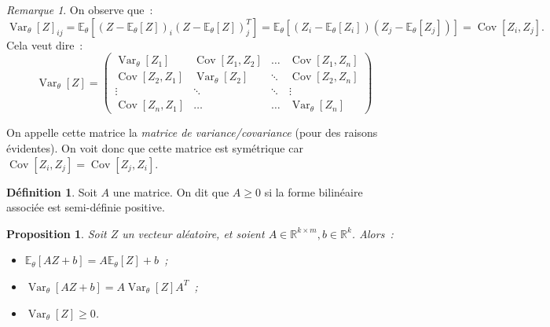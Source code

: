 \documentclass{report}
\DeclareMathOperator{\Var}{Var}
\DeclareMathOperator{\Cov}{Cov}
\newcommand{\E}{\mathbb E}
\newcommand{\R}{\mathbb R}
\newtheorem{prp}[thm]{Proposition}
\theoremstyle{definition}
\newtheorem{déf}[thm]{Définition}
\theoremstyle{remark}
\newtheorem*{rmq}{Remarque}
\begin{document}
			\begin{rmq} On observe que~:
			\[\Var_\theta[Z]_{ij} = \E_\theta\left[(Z - \E_\theta[Z])_i(Z - \E_\theta[Z])_j^T\right] = \E_\theta\left[(Z_i - \E_\theta[Z_i])(Z_j - \E_\theta[Z_j])\right]
				= \Cov[Z_i, Z_j].\]
			Cela veut dire~:
			\[\Var_\theta[Z] =
				\begin{pmatrix}
					\Var_\theta[Z_1]      & \Cov[Z_1, Z_2] & \ldots & \Cov[Z_1, Z_n] \\
					\Cov[Z_2, Z_1] & \Var_\theta[Z_2]      & \ddots & \Cov[Z_2, Z_n] \\
					\vdots         & \ddots         & \ddots & \vdots         \\
					\Cov[Z_n, Z_1] & \ldots         & \ldots & \Var_\theta[Z_n]
				\end{pmatrix}
			\]

			On appelle cette matrice la \textit{matrice de variance/covariance} (pour des raisons évidentes). On voit donc que cette matrice est symétrique car
			$\Cov[Z_i, Z_j] = \Cov[Z_j, Z_i]$.
			\end{rmq}

			\begin{déf} Soit $A$ une matrice. On dit que $A \geq 0$ si la forme bilinéaire associée est semi-définie positive.
			\end{déf}

			\begin{prp} Soit $Z$ un vecteur aléatoire, et soient $A \in \R^{k \times m}, b \in \R^k$. Alors~:
			\begin{itemize}
				\item $\E_\theta[AZ + b] = A\E_\theta[Z] + b$~;
				\item $\Var_\theta[AZ + b] = A\Var_\theta[Z]A^T$~;
				\item $\Var_\theta[Z] \geq 0$.
			\end{itemize}
			\end{prp}
\end{document}
